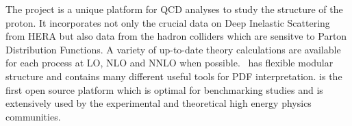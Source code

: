 
The \fitter project is a unique platform for QCD analyses to study the 
structure of the proton. It incorporates not only the crucial data on
Deep Inelastic Scattering from HERA but also data from the hadron colliders 
which are sensitve to Parton Distribution Functions. A variety of up-to-date 
theory calculations are available for each process at LO, NLO and NNLO 
when possible.  
\fitter\ has flexible modular structure and contains many different useful tools for PDF interpretation. 
\fitter is the first open source platform which is optimal for benchmarking studies
and is extensively used by the experimental and theoretical high energy physics
communities.

